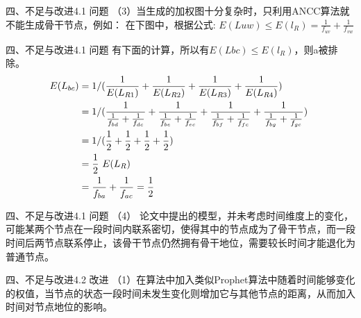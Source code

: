 \documentclass[12pt,aspectratio=43,table]{beamer}
\begin{document}
\begin{frame}{四、不足与改进}{4.1 问题}
（3）当生成的加权图十分复杂时，只利用ANCC算法就不能生成骨干节点，例如：
在下图中，根据公式: $E(L{uw})\le E(l_R)=\frac{1}{f_{uv}}+\frac{1}{f_{vw}}$
\begin{figure}
\end{figure}


\end{frame}

\begin{frame}{ 四、不足与改进}{4.1 问题}
有下面的计算，所以有$E(L{bc})\le E(l_R)$，则a被排除。
\begin{equation}
$$\begin{align} E(L_{bc})&=1/(\frac{1}{E(L_{R1})}+\frac{1}{E(L_{R2})}+\frac{1}{E(L_{R3})}+\frac{1}{E(L_{R4})})\  \\ &=1/(\frac{1}{\frac{1}{f_{bd}}+\frac{1}{f_{dc}}} + \frac{1}{\frac{1}{f_{be}}+\frac{1}{f_{ec}}} + \frac{1}{\frac{1}{f_{bf}}+\frac{1}{f_{fc}}} + \frac{1}{\frac{1}{f_{bg}}+\frac{1}{f_{gc}}})\  \nonumber \\
&=1/(\frac{1}{2} + \frac{1}{2} + \frac{1}{2} + \frac{1}{2})\    \nonumber \\
&=\frac{1}{2}\ E(L_R)\ \nonumber \\
&=\frac{1}{f_{ba}} + \frac{1}{f_{ac}} \nonumber
=\frac{1}{2}   \nonumber
\end{align} $$
\end{equation}
\end{frame}

\begin{frame}{四、不足与改进}{4.1 问题}
（4） 论文中提出的模型，并未考虑时间维度上的变化，可能某两个节点在一段时间内联系密切，使得其中的节点成为了骨干节点，而一段时间后两节点联系停止，该骨干节点仍然拥有骨干地位，需要较长时间才能退化为普通节点。
\end{frame}

\begin{frame}{ 四、不足与改进}{4.2 改进}
（1）在算法中加入类似Prophet算法中随着时间能够变化的权值，当节点的状态一段时间未发生变化则增加它与其他节点的距离，从而加入时间对节点地位的影响。
\end{frame}
\end{document}
